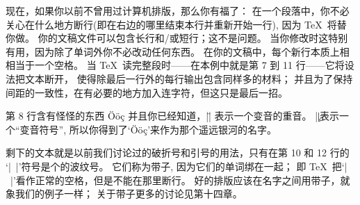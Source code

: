 \1现在，如果你以前不曾用过计算机排版，那么你有福了：
在一个段落中，你不必关心在什么地方断行(即在右边的哪里结束本行并重新开始一行),
因为 \TeX\ 将替你做。%
你的文稿文件可以包含长行和/或短行；这不是问题。%
当你修改时这特别有用，因为除了单词外你不必改动任何东\hbox{西。}%
{在你的文稿中，每个新行本质上相相当于一个空格}。
当 \TeX\ 读完整段时——在本例中就是第 7 到 11 行——它将设法把文本断开，
使得除最后一行外的每行输出包含同样多的材料；
并且为了保持间距的一致性，在有必要的地方加入连字符，但这只是最后一招。

第 8 行含有怪怪的东西
\begintt
\"O\"o\c c
\endtt
并且你已经知道，|\"| 表示一个变音的重音。%
|\c|表示一个``变音符号'', 所以你得到了`\"O\"o\c c'来作为那个遥远银河的名字。

剩下的文本就是以前我们讨论过的破折号和引号的用法，只有在第 10 和 12 行的%
`|~|'符号是个的波纹号。%
它们称为{带子}, 因为它们的单词绑在一起；
即 \TeX\ 把`|~|'看作正常的空格，但是不能在那里断行。%
好的排版应该在名字之间用带子，就象我们的例子一样；
关于带子更多的讨论见第十四章。


